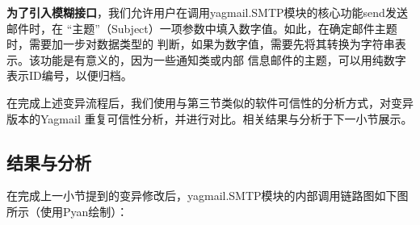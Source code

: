 \documentclass[UTF8,12pt,a4paper]{ctexart}
\begin{document}
    \textbf{为了引入模糊接口}，我们允许用户在调用yagmail.SMTP模块的核心功能send发送邮件时，在
    “主题”（Subject）一项参数中填入数字值。如此，在确定邮件主题时，需要加一步对数据类型的
    判断，如果为数字值，需要先将其转换为字符串表示。该功能是有意义的，因为一些通知类或内部
    信息邮件的主题，可以用纯数字表示ID编号，以便归档。
    
    在完成上述变异流程后，我们使用与第三节类似的软件可信性的分析方式，对变异版本的Yagmail
    重复可信性分析，并进行对比。相关结果与分析于下一小节展示。

\subsection{结果与分析}
    
    在完成上一小节提到的变异修改后，yagmail.SMTP模块的内部调用链路图如下图所示（使用Pyan绘制）：
    
\end{document}
